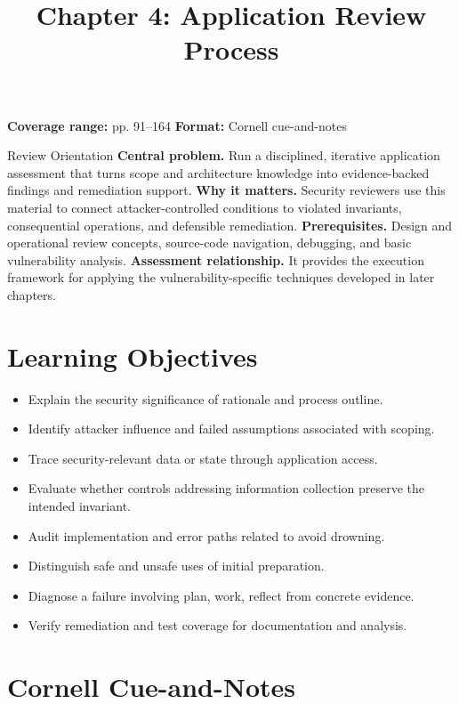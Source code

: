 \documentclass[11pt,letterpaper]{article}
\title{Chapter 4: Application Review Process}
\author{}
\date{}
\begin{document}
\maketitle

\begin{center}
\small\color{Meta}\textbf{Coverage range:} pp. 91--164 \quad\textbullet\quad \textbf{Format:} Cornell cue-and-notes
\end{center}
\vspace{0.25em}
\begin{CornellOverviewBox}{Review Orientation}
\textbf{Central problem.} Run a disciplined, iterative application assessment that turns scope and architecture knowledge into evidence-backed findings and remediation support.
\textbf{Why it matters.} Security reviewers use this material to connect attacker-controlled conditions to violated invariants, consequential operations, and defensible remediation.
\textbf{Prerequisites.} Design and operational review concepts, source-code navigation, debugging, and basic vulnerability analysis.
\textbf{Assessment relationship.} It provides the execution framework for applying the vulnerability-specific techniques developed in later chapters.
\end{CornellOverviewBox}
\section{Learning Objectives}
\begin{itemize}
\item Explain the security significance of rationale and process outline.
\item Identify attacker influence and failed assumptions associated with scoping.
\item Trace security-relevant data or state through application access.
\item Evaluate whether controls addressing information collection preserve the intended invariant.
\item Audit implementation and error paths related to avoid drowning.
\item Distinguish safe and unsafe uses of initial preparation.
\item Diagnose a failure involving plan, work, reflect from concrete evidence.
\item Verify remediation and test coverage for documentation and analysis.
\end{itemize}
\section{Cornell Cue-and-Notes}
\end{document}
